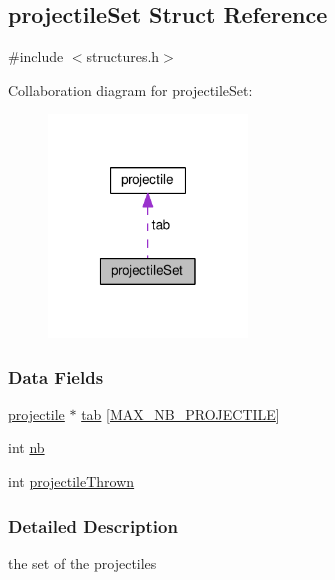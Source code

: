 \hypertarget{structprojectile_set}{\subsection{projectile\-Set Struct Reference}
\label{structprojectile_set}
}


{\ttfamily \#include $<$structures.\-h$>$}



Collaboration diagram for projectile\-Set\-:
\nopagebreak
\begin{figure}[H]
\begin{center}
\leavevmode
\includegraphics[width=150pt]{structprojectile_set__coll__graph}
\end{center}
\end{figure}
\subsubsection*{Data Fields}
\begin{DoxyCompactItemize}
\item 
\hyperlink{structprojectile}{projectile} $\ast$ \hyperlink{structprojectile_set_ac4cbcd75bc678f0ad2b2d416ce87dc6d}{tab} \mbox{[}\hyperlink{const_8h_a180d2c389d68d43eb0e3df2d573fecf4}{M\-A\-X\-\_\-\-N\-B\-\_\-\-P\-R\-O\-J\-E\-C\-T\-I\-L\-E}\mbox{]}
\item 
int \hyperlink{structprojectile_set_ab310c6afcc676eab3930dce2650511c0}{nb}
\item 
int \hyperlink{structprojectile_set_accfd9d1d6194770a3368821b58ffc3b6}{projectile\-Thrown}
\end{DoxyCompactItemize}


\subsubsection{Detailed Description}
the set of the projectiles 

